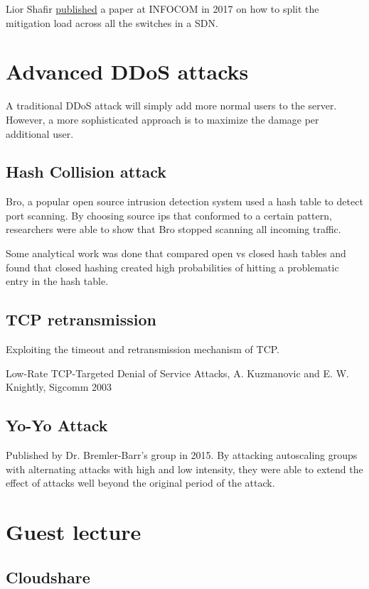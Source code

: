 \documentclass{idc_msc}
\begin{document}
Lior Shafir \href{http://www.sdn-anti-spoofing.net/}{published} a paper at INFOCOM in 2017 on how to split the mitigation load across all the switches in a SDN.

\section{Advanced DDoS attacks}

A traditional DDoS attack will simply add more normal users to the server.
However, a more sophisticated approach is to maximize the damage per additional user.

\subsection{Hash Collision attack}

Bro, a popular open source intrusion detection system used a hash table to detect port scanning.
By choosing source ips that conformed to a certain pattern, researchers were able to show that Bro stopped scanning all incoming traffic.

Some analytical work was done that compared open vs closed hash tables and found that closed hashing created high probabilities of hitting a problematic entry in the hash table.

\subsection{TCP retransmission}

Exploiting the timeout and retransmission mechanism of TCP.

Low-Rate TCP-Targeted Denial of Service Attacks, A. Kuzmanovic and E. W. Knightly, Sigcomm 2003

\subsection{Yo-Yo Attack}

Published by Dr. Bremler-Barr's group in 2015.
By attacking autoscaling groups with alternating attacks with high and low intensity, they were able to extend the effect of attacks well beyond the original period of the attack.

\section{Guest lecture}

\subsection{Cloudshare}
\end{document}
